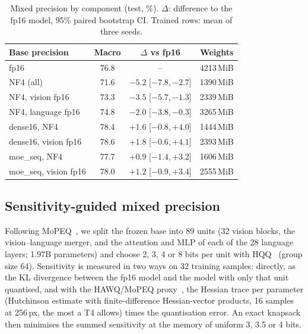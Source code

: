 \documentclass[conference]{IEEEtran}
\begin{document}
\begin{table}[t]
\centering
\caption{Mixed precision by component (test, \%). $\Delta$: difference to the fp16 model, 95\% paired
bootstrap CI. Trained rows: mean of three seeds.}
\label{tab:vis}
\setlength{\tabcolsep}{3pt}
\begin{tabular}{lccc}
\toprule
Base precision & Macro & $\Delta$ vs fp16 & Weights \\
\midrule
fp16 & 76.8 & -- & 4213\,MiB \\
NF4 (all) & 71.6 & $-5.2$ [$-7.8,-2.7$] & 1390\,MiB \\
NF4, vision fp16 & 73.3 & $-3.5$ [$-5.7,-1.3$] & 2339\,MiB \\
NF4, language fp16 & 74.8 & $-2.0$ [$-3.8,-0.3$] & 3265\,MiB \\
\midrule
dense16, NF4 & 78.4 & $+1.6$ [$-0.8,+4.0$] & 1444\,MiB \\
dense16, vision fp16 & 78.6 & $+1.8$ [$-0.6,+4.1$] & 2393\,MiB \\
moe\_seq, NF4 & 77.7 & $+0.9$ [$-1.4,+3.2$] & 1606\,MiB \\
moe\_seq, vision fp16 & 78.0 & $+1.2$ [$-0.9,+3.4$] & 2555\,MiB \\
\bottomrule
\end{tabular}
\end{table}

\subsection{Sensitivity-guided mixed precision}
\label{sec:mixed}
Following MoPEQ~\cite{chitty2025mopeq}, we split the frozen base into 89 units (32 vision blocks, the
vision--language merger, and the attention and MLP of each of the 28 language layers; 1.97B
parameters) and choose 2, 3, 4 or 8 bits per unit with HQQ~\cite{badri2023hqq} (group size 64).
Sensitivity is measured in two ways on 32 training samples: directly, as the KL divergence between the
fp16 model and the model with only that unit quantised, and with the HAWQ/MoPEQ
proxy~\cite{dong2019hawq}, the Hessian trace per parameter (Hutchinson estimate with finite-difference
Hessian-vector products, 16 samples at 256\,px, the most a T4 allows) times the quantisation error.
An exact knapsack then minimises the summed sensitivity at the memory of uniform 3, 3.5 or 4 bits.
\end{document}
